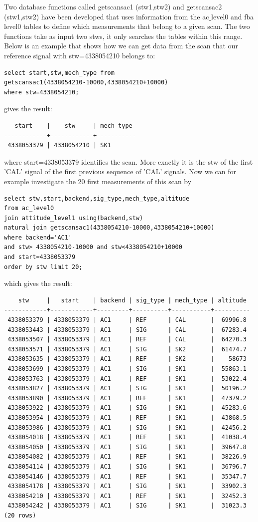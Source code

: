 \documentclass[12pt]{article}
\begin{document}
Two database functions called getscansac1 (stw1,stw2)
and getscansac2 (stw1,stw2) have been developed that uses information
from the ac\underline{ }level0 and fba\underline{ }level0
tables to define which measurements that belong to a given scan.
The two functions take as input two stws, it only searches
the tables within this range. Below is an example that shows how we 
can get data from the scan that our reference signal with stw=4338054210
belongs to:
\begin{verbatim}
select start,stw,mech_type from 
getscansac1(4338054210-10000,4338054210+10000)
where stw=4338054210;
\end{verbatim}
gives the result:
\begin{verbatim}
   start    |    stw     | mech_type 
------------+------------+-----------
 4338053379 | 4338054210 | SK1
\end{verbatim}
where start=4338053379 identifies the scan. More exactly it is the stw
of the first 'CAL' signal of the first previous sequence of
'CAL' signals.   
Now we can for example investigate the 20 first measurements of this scan 
by
\begin{verbatim}
select stw,start,backend,sig_type,mech_type,altitude
from ac_level0
join attitude_level1 using(backend,stw)
natural join getscansac1(4338054210-10000,4338054210+10000)
where backend='AC1' 
and stw> 4338054210-10000 and stw<4338054210+10000
and start=4338053379
order by stw limit 20;
\end{verbatim}
which gives the result:
\clearpage
\newpage
\begin{verbatim}
    stw     |   start    | backend | sig_type | mech_type | altitude 
------------+------------+---------+----------+-----------+----------
 4338053379 | 4338053379 | AC1     | REF      | CAL       |  69996.8
 4338053443 | 4338053379 | AC1     | SIG      | CAL       |  67283.4
 4338053507 | 4338053379 | AC1     | REF      | CAL       |  64270.3
 4338053571 | 4338053379 | AC1     | SIG      | SK2       |  61474.7
 4338053635 | 4338053379 | AC1     | REF      | SK2       |    58673
 4338053699 | 4338053379 | AC1     | SIG      | SK1       |  55863.1
 4338053763 | 4338053379 | AC1     | REF      | SK1       |  53022.4
 4338053827 | 4338053379 | AC1     | SIG      | SK1       |  50196.2
 4338053890 | 4338053379 | AC1     | REF      | SK1       |  47379.2
 4338053922 | 4338053379 | AC1     | SIG      | SK1       |  45283.6
 4338053954 | 4338053379 | AC1     | REF      | SK1       |  43868.5
 4338053986 | 4338053379 | AC1     | SIG      | SK1       |  42456.2
 4338054018 | 4338053379 | AC1     | REF      | SK1       |  41038.4
 4338054050 | 4338053379 | AC1     | SIG      | SK1       |  39647.8
 4338054082 | 4338053379 | AC1     | REF      | SK1       |  38226.9
 4338054114 | 4338053379 | AC1     | SIG      | SK1       |  36796.7
 4338054146 | 4338053379 | AC1     | REF      | SK1       |  35347.7
 4338054178 | 4338053379 | AC1     | SIG      | SK1       |  33902.3
 4338054210 | 4338053379 | AC1     | REF      | SK1       |  32452.3
 4338054242 | 4338053379 | AC1     | SIG      | SK1       |  31023.3
(20 rows)
\end{verbatim}
\end{document}
